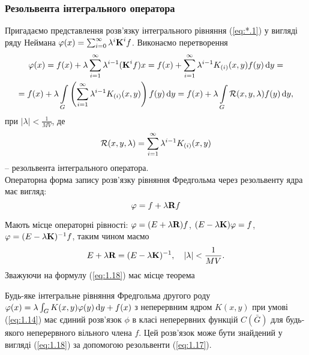 \subsubsection*{Резольвента інтегрального оператора}

Пригадаємо представлення розв’язку інтегрального рівняння (\ref{eq:*.1}) у вигляді ряду Неймана $\phi(x) = \sum_{i = 0}^\infty \lambda^i \bf{K}^i f$. Виконаємо перетворення
\begin{multline*}
	\phi(x) = f(x) + \lambda \Sum_{i = 1}^\infty \lambda^{i - 1} (\bf{K}^i f) x = f(x) + \Sum_{i = 1}^\infty \lambda^{i - 1} K_{(i)} (x, y) f(y) \diff y = \\
	= f(x) + \lambda \Int_G \left( \Sum_{i = 1}^\infty \lambda^{i - 1} K_{(i)} (x, y) \right) f(y) \diff y = f(x) + \lambda \Int_G \mathcal{R}(x, y, \lambda) f(y) \diff y,
\end{multline*}
при $|\lambda| < \frac{1}{MV}$, де
\begin{equation}
	\label{eq:1.17}
	\mathcal{R}(x, y, \lambda) = \Sum_{i = 1}^\infty \lambda^{i - 1} K_{(i)} (x, y)
\end{equation}
-- резольвента інтегрального оператора. \\

Операторна форма запису розв’язку рівняння Фредгольма через резольвенту ядра має вигляд:
\begin{equation}
	\label{eq:1.18}
	\phi = f + \lambda \bf{R} f
\end{equation}

Мають місце операторні рівності: $\phi = (E + \lambda \bf{R})f$, $(E - \lambda \bf{K})\phi = f$, $\phi = (E - \lambda \bf{K})^{-1}f$, таким чином маємо
\begin{equation}
	\label{eq:1.19}
	E + \lambda \bf{R} = (E - \lambda \bf{K})^{-1}, \quad |\lambda| < \dfrac{1}{MV}.
\end{equation}
Зважуючи на формулу (\ref{eq:1.18}) має місце теорема
\begin{theorem}
	Будь-яке інтегральне рівняння Фредгольма другого роду $\phi(x) = \lambda \int_G K(x, y) \phi(y) \diff y + f(x)$ з неперервним ядром $K(x, y)$ при умові (\ref{eq:1.14}) має єдиний розв’язок $\phi$ в класі неперервних функцій $C(\bar G)$ для будь-якого неперервного вільного члена $f$. Цей розв’язок може бути знайдений у вигляді (\ref{eq:1.18}) за допомогою резольвенти (\ref{eq:1.17}).
\end{theorem}

